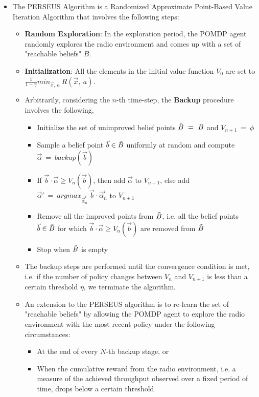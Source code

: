 \documentclass[12pt, draftcls, onecolumn]{IEEEtran}
\begin{document}
\begin{itemize}
    \begin{itemize}
    \item The PERSEUS Algorithm is a Randomized Approximate Point-Based Value Iteration Algorithm that involves the following steps:
    \begin{itemize}
        \item \textbf{Random Exploration}: In the exploration period, the POMDP agent randomly explores the radio environment and comes up with a set of "reachable beliefs" $B$.
        \item \textbf{Initialization}: All the elements in the initial value function $V_0$ are set to $\frac{1}{1-\gamma}min_{\vec{x},\ a}\ R(\vec{x},\ a)$.
        \item Arbitrarily, considering the $n$-th time-step, the \textbf{Backup} procedure involves the following,
        \begin{itemize}
            \item Initialize the set of unimproved belief points $\Tilde{B}\ =\ B$ and $V_{n+1}\ =\ \phi$
            \item Sample a belief point $\vec{b} \in \Tilde{B}$ uniformly at random and compute $\vec{\alpha}\ =\ backup(\vec{b})$
            \item If $\vec{b} \cdot \vec{\alpha} \geq V_n(\vec{b})$, then add $\vec{\alpha}$ to $V_{n+1}$, else add $\vec{\alpha}'\ =\ argmax_{\vec{\alpha}_n^i}\ \vec{b} \cdot \vec{\alpha}_n^i$ to $V_{n+1}$
            \item Remove all the improved points from $\Tilde{B}$, i.e. all the belief points $\vec{b} \in \Tilde{B}$ for which $\vec{b} \cdot \vec{\alpha} \geq V_n(\vec{b})$ are removed from $\Tilde{B}$
            \item Stop when $\Tilde{B}$ is empty
        \end{itemize}
        \item The backup steps are performed until the convergence condition is met, i.e. if the number of policy changes between $V_{n}$ and $V_{n+1}$ is less than a certain threshold $\eta$, we terminate the algorithm.
        \item An extension to the PERSEUS algorithm is to re-learn the set of "reachable beliefs" by allowing the POMDP agent to explore the radio environment with the most recent policy under the following circumstances:
        \begin{itemize}
            \item At the end of every $N$-th backup stage, or
            \item When the cumulative reward from the radio environment, i.e. a measure of the achieved throughput observed over a fixed period of time, drops below a certain threshold

\end{itemize}
\end{itemize}
\end{itemize}
\end{itemize}
\end{document}
